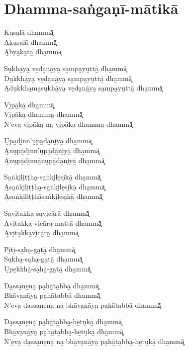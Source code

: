 \chapter{Dhamma-saṅgaṇī-mātikā}


\begin{paritta}
Ku̮sa̮lā̱ dha̱mmā͓\\
A̮ku̮sa̮lā̱ dha̱mmā͓\\
A̮byā̱ka̮tā̱ dha̱mmā͓

Su̮khā̱ya̮ ve̱da̮nā̱ya̮ sa̱mpa̮yu̱ttā̱ dha̱mmā͓\\
Du̱kkhā̱ya̮ ve̱da̮nā̱ya̮ sa̱mpa̮yu̱ttā̱ dha̱mmā͓\\
A̮du̱kkha̮ma̮su̮khā̱ya̮ ve̱da̮nā̱ya̮ sa̱mpa̮yu̱ttā̱ dha̱mmā͓

Vi̮pā̱kā̱ dha̱mmā͓\\
Vi̮pā̱ka̮-dha̱mma̮-dha̱mmā͓\\
N'e̱va̮ vi̮pā̱ka̮ na̮ vi̮pā̱ka̮-dha̱mma̮-dha̱mmā͓

U̮pā̱di̱nn'u̮pā̱dā̱ni̮yā̱ dha̱mmā͓\\
A̮nu̮pā̱di̱nn'u̮pā̱dā̱ni̮yā̱ dha̱mmā͓\\
A̮nu̮pā̱di̱nnā̱nu̮pā̱dā̱ni̮yā̱ dha̱mmā͓

Sa̱ṅki̮li̱ṭṭha̮-sa̱ṅki̮le̱si̮kā̱ dha̱mmā͓\\
A̮sa̱ṅki̮li̱ṭṭha̮-sa̱ṅki̮le̱si̮kā̱ dha̱mmā͓\\
A̮sa̱ṅki̮li̱ṭṭhā̱sa̱ṅki̮le̱si̮kā̱ dha̱mmā͓

Sa̮vi̮ta̱kka̮-sa̮vi̮cā̱rā̱ dha̱mmā͓\\
A̮vi̮ta̱kka̮-vi̮cā̱ra̮-ma̱ttā̱ dha̱mmā͓\\
A̮vi̮ta̱kkā̱vi̮cā̱rā̱ dha̱mmā͓

Pī̱ti̮-sa̮ha̮-ga̮tā̱ dha̱mmā͓\\
Su̮kha̮-sa̮ha̮-ga̮tā̱ dha̱mmā͓\\
U̮pe̱kkhā̱-sa̮ha̮-ga̮tā̱ dha̱mmā͓

\enlargethispage{\baselineskip}

Da̱ssa̮ne̱na̮ pa̮hā̱ta̱bbā̱ dha̱mmā͓\\
Bhā̱va̮nā̱ya̮ pa̮hā̱ta̱bbā̱ dha̱mmā͓\\
N'e̱va̮ da̱ssa̮ne̱na̮ na̮ bhā̱va̮nā̱ya̮ pa̮hā̱ta̱bbā̱ dha̱mmā͓

\clearpage

Da̱ssa̮ne̱na̮ pa̮hā̱ta̱bba̮-he̱tu̮kā̱ dha̱mmā͓\\
Bhā̱va̮nā̱ya̮ pa̮hā̱ta̱bba̮-he̱tu̮kā̱ dha̱mmā͓\\
N'e̱va̮ da̱ssa̮ne̱na̮ na̮ bhā̱va̮nā̱ya̮ pa̮hā̱ta̱bba̮-he̱tu̮kā̱ dha̱mmā͓


\end{paritta}
